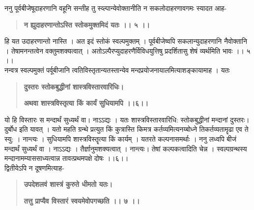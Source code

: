 \documentclass[11pt, openany]{book}
\begin{document}
\begin{sloppypar}
\hangindent=0.2in \hspace{0.2in}ननु पूर्वबीजेषूदाहरणानि वहूनि सन्तीह तु स्व्ल्पान्येवोक्तानीति न सकलोदाहरणावगमः स्यादत आह- 

\begin{quote}
\hspace{0.5in}\textbf{न ह्युदाहरणान्तोऽस्ति स्तोकमुक्तमिदं यतः ।। ५ ।।}
\end{quote}

\hangindent=0.2in \hspace{0.2in}हि यत उदाहरणान्तो नास्ति । अत इदं स्तोकं स्वल्पमुक्तम् । पूर्वबीजेष्वपि सकलान्युदाहरणानि नैवोक्तानि । तेषामनन्तत्वेन वक्तुमशक्यत्वात् । अतोऽल्पैरप्युदाहरणैर्विविधयुत्तिषु प्रदर्शितासु शेषं व्यर्थमिति भावः ।। ५ ।।\\

\hangindent=0.2in \hspace{0.2in}नन्वत्र स्वल्पमुक्तं पर्वूबीजानि त्वतिविस्तृतान्यतस्तान्येव मन्दप्रयोजनायालमित्याशङ्कायामाह । यतः \textendash

\begin{quote}
\hspace{0.5in}\textbf{दुस्तरः स्तोकबुद्धीनां शास्त्रविस्तारवारिधिः।}

\hspace{0.5in}\textbf{अथवा शास्त्रविस्तृत्या किं कार्यं सुधियामपि ।।६।।}
\end{quote}

\hangindent=0.2in \hspace{0.2in}यो हि विस्तारः स मन्दार्थं सुध्यर्थं वा। नाऽऽद्यः । यतः शास्त्रविस्तारवारिधि: स्तोकबुद्धीनां मन्दानां दुस्तरः। दुर्बोध इति यावत् । यतो महति ग्रन्थे प्रत्युत किं कुत्रास्ति किमत्र कर्तव्यमित्यनय्बोध्ने तिकर्तव्यतामॄढा एव ते स्यु: । नान्त्यः । सुधियामपि शास्त्रविस्तॄत्या किं कार्यम् । यतरते कल्पनासमर्थाः । ननु लध्वपि बीजं मन्दार्थं सुध्यर्थं वा । नाऽऽद्यः । तैर्ज्ञानुमशक्यत्वात् । नान्त्यः। तेषां कल्पकत्वादिति चेन्न । स्वल्पग्रन्थस्य मन्दानामम्याससाध्यत्वान्न तावत्प्रथमपक्षे दोषः ।।६।।\\

\hangindent=0.2in \hspace{0.2in}द्वितीयेऽपि न दूषणमित्याह- 

\begin{quote}
\hspace{0.5in}\textbf{उपदेशलवं शास्त्रं कुरुते धीमतो यतः।}

\hspace{0.5in}\textbf{तत्तु प्राप्यैव विस्तारं स्वयमेवोपगच्छति ।। ७ ।।}
\end{quote}


\end{sloppypar}
\end{document}
